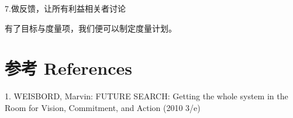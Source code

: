 7.做反馈，让所有利益相关者讨论

有了目标与度量项，我们便可以制定度量计划。




\hypertarget{ux9644ux4ef6}{%
\section{参考 References}\label{ux9644ux4ef6}}

1. WEISBORD, Marvin: FUTURE SEARCH: Getting the whole system in the Room
for Vision, Commitment, and Action (2010 3/e)\\



